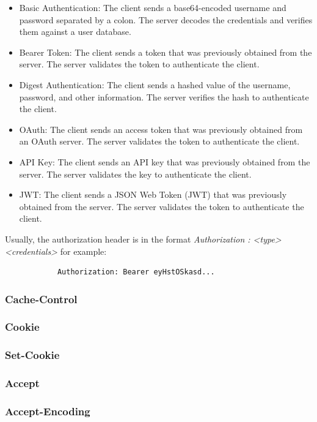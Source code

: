 \documentclass[a4paper]{article}
\begin{document}
        \begin{itemize}
            \item Basic Authentication: The client sends a base64-encoded username and password separated by a colon. The server decodes the credentials and verifies them against a user database.
            \item Bearer Token: The client sends a token that was previously obtained from the server. The server validates the token to authenticate the client.
            \item Digest Authentication: The client sends a hashed value of the username, password, and other information. The server verifies the hash to authenticate the client.
            \item OAuth: The client sends an access token that was previously obtained from an OAuth server. The server validates the token to authenticate the client.
            \item API Key: The client sends an API key that was previously obtained from the server. The server validates the key to authenticate the client.
            \item JWT: The client sends a JSON Web Token (JWT) that was previously obtained from the server. The server validates the token to authenticate the client.
        \end{itemize}

        Usually, the authorization header is in the format \textit{Authorization : <type> <credentials>} for example:

        \begin{verbatim}
            Authorization: Bearer eyHstOSkasd...
        \end{verbatim}


        \subsubsection{Cache-Control}
        \subsubsection{Cookie}
        \subsubsection{Set-Cookie}
        \subsubsection{Accept}
        \subsubsection{Accept-Encoding}
\end{document}

